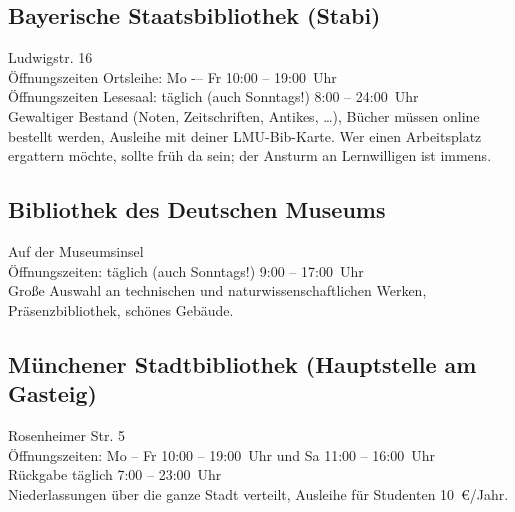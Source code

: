 \subsection*{Bayerische Staatsbibliothek (Stabi)}
Ludwigstr. 16\\
Öffnungszeiten Ortsleihe: Mo -– Fr 10:00 -- 19:00~Uhr\\
Öffnungszeiten Lesesaal: täglich (auch Sonntags!) 8:00 -- 24:00~Uhr\\
Gewaltiger Bestand (Noten, Zeitschriften, Antikes, \ldots), Bücher
müssen online bestellt werden, Ausleihe mit deiner LMU-Bib-Karte. Wer
einen Arbeitsplatz ergattern möchte, sollte früh da sein; der
Ansturm an Lernwilligen ist immens.
\begin{urlList}
\end{urlList}

\subsection*{Bibliothek des Deutschen Museums}
Auf der Museumsinsel\\
Öffnungszeiten: täglich (auch Sonntags!) 9:00 -- 17:00~Uhr\\
Große Auswahl an technischen und naturwissenschaftlichen Werken, Präsenzbibliothek, schönes Gebäude.
\begin{urlList}
\end{urlList}

\subsection*{Münchener Stadtbibliothek (Hauptstelle am Gasteig)}
Rosenheimer Str. 5\\
Öffnungszeiten: Mo -- Fr 10:00 -- 19:00~Uhr und Sa 11:00 -- 16:00~Uhr\\
Rückgabe täglich 7:00 -- 23:00~Uhr\\
Niederlassungen über die ganze Stadt verteilt, Ausleihe für Studenten 10~€/Jahr.
\begin{urlList}
\end{urlList}

